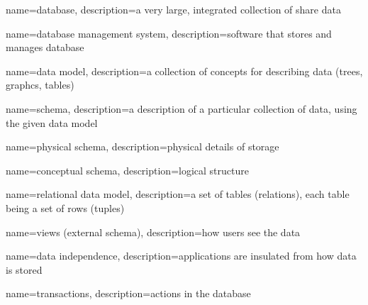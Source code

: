 {
  name=database,
  description={a very large, integrated collection of share data}
}

{
  name=database management system,
  description={software that stores and manages database}
}


{
  name={data model},
  description={a collection of concepts for describing data (trees, graphcs,
  tables)}
}

{
  name={schema},
  description={a description of a particular collection of data, using the given
  data model}
}

{
  name={physical schema},
  description={physical details of storage}
}

{
  name={conceptual schema},
  description={logical structure}
}

{
  name={relational data model},
  description={a set of tables (relations), each table being a set of rows
  (tuples)}
}

{
  name={views (external schema)},
  description={how users see the data}
}

{
  name={data independence},
  description={applications are insulated from how data is stored}
}

{
  name={transactions},
  description={actions in the database}
}
